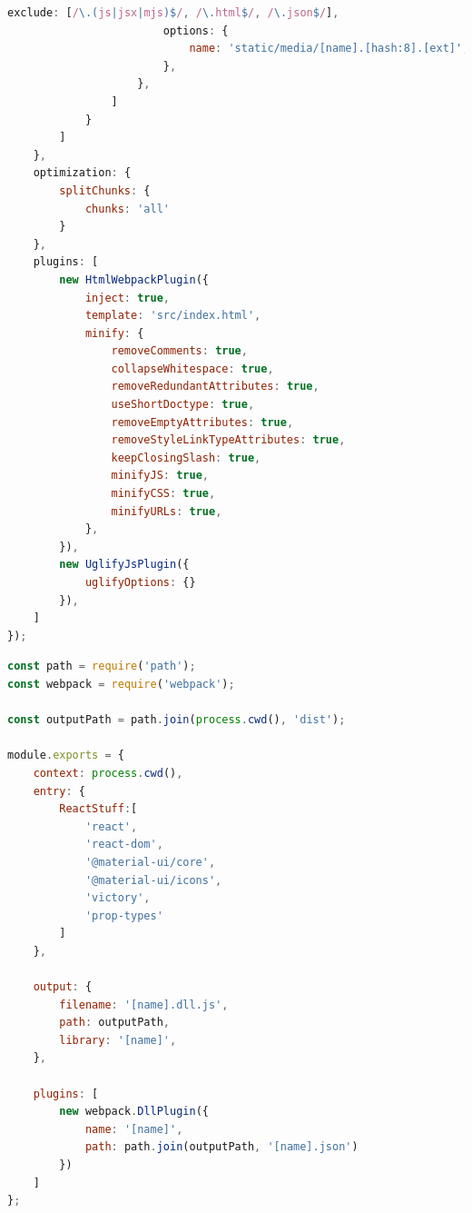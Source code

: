 \documentclass[11pt]{report}
\begin{document}
\begin{lstlisting}[language=JavaScript,label={figure:baselineConfiguration},caption={Ausgangskonfiguration für Webpack 4 (webpack.config.js)}]
                        exclude: [/\.(js|jsx|mjs)$/, /\.html$/, /\.json$/],
                        options: {
                            name: 'static/media/[name].[hash:8].[ext]',
                        },
                    },
                ]
            }
        ]
    },
    optimization: {
        splitChunks: {
            chunks: 'all'
        }
    },
    plugins: [
        new HtmlWebpackPlugin({
            inject: true,
            template: 'src/index.html',
            minify: {
                removeComments: true,
                collapseWhitespace: true,
                removeRedundantAttributes: true,
                useShortDoctype: true,
                removeEmptyAttributes: true,
                removeStyleLinkTypeAttributes: true,
                keepClosingSlash: true,
                minifyJS: true,
                minifyCSS: true,
                minifyURLs: true,
            },
        }),
        new UglifyJsPlugin({
            uglifyOptions: {}
        }),
    ]
});
	\end{lstlisting}
	\pagebreak
	\begin{lstlisting}[language=JavaScript,caption={Scoped compilation Konfigurationsdatei (webpack.vendor.config.js)},label={vendorConfig}]
const path = require('path');
const webpack = require('webpack');

const outputPath = path.join(process.cwd(), 'dist');

module.exports = {
    context: process.cwd(),
    entry: {
        ReactStuff:[
            'react',
            'react-dom',
            '@material-ui/core',
            '@material-ui/icons',
            'victory',
            'prop-types'
        ]
    },

    output: {
        filename: '[name].dll.js',
        path: outputPath,
        library: '[name]',
    },

    plugins: [
        new webpack.DllPlugin({
            name: '[name]',
            path: path.join(outputPath, '[name].json')
        })
    ]
};
		        	\end{lstlisting}

    \glsaddall
    \printglossary
    \printglossary[type=\acronymtype]


    \nocite{*}
    
\end{document}
